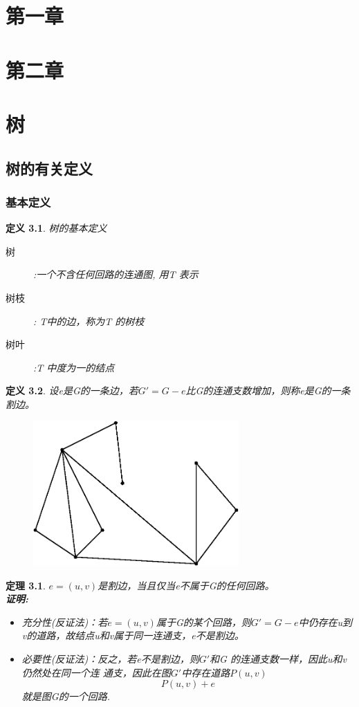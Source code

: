 \documentclass[11pt,a4paper,openany]{book}
\newtheorem{theorem}{\textbf{定理}}[section]
\newtheorem{defination}{\textbf{定义}}[section]
\begin{document}
\chapter{第一章}

\chapter{第二章}
\chapter{树}
\section{树的有关定义}
\subsection{基本定义}
\begin{defination}
树的基本定义\begin{description}
        \item[树] :一个不含任何回路的连通图, 用T 表示
        \item[树枝]: T中的边，称为T 的树枝
        \item[树叶] :T 中度为一的结点
      \end{description}
\end{defination}
\begin{defination}
设e是G的一条边，若$G'=G-e$比G的连通支数增加，则称e是G的一条割边。\\
\begin{figure}[H]
  \centering
  \includegraphics[width=0.7\textwidth]{3_1.eps}\\
  \caption{}
\end{figure}
\end{defination}
\begin{theorem}
$e=(u,v)$是割边，当且仅当e不属于G的任何回路。\\
\textbf{证明:}\\
\begin{itemize}
  \item 充分性(反证法)：若$e=(u,v)$属于G的某个回路，则$G'=G-e$中仍存在u到v的道路，故结点u和v属于同一连通支，e不是割边。
  \item 必要性(反证法)：反之，若e不是割边，则$G'$和G
的连通支数一样，因此u和v仍然处在同一个连
通支，因此在图$G'$中存在道路$P(u,v)$ $$P(u,v)+e$$就是图G的一个回路.
\end{itemize}
\end{theorem}
\end{document}
